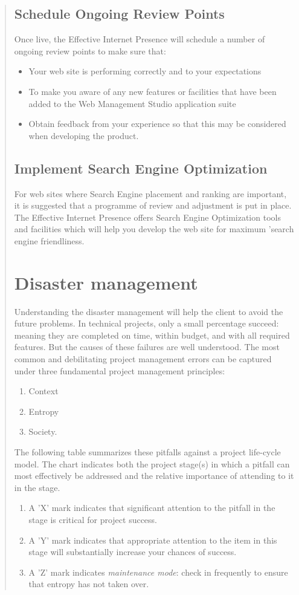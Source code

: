 \documentclass[35pt]{report}
\begin{document}
\begin{quote}
			\subsection{Schedule Ongoing Review Points}
			Once live, the Effective Internet Presence will schedule a number of ongoing review points to make sure that:
			\begin{itemize}
				\item Your web site is performing correctly and to your expectations
				\item To make you aware of any new features or facilities that have been added to the Web Management Studio application suite
				\item Obtain feedback from your experience so that this may be considered when developing the product.
			\end{itemize}
			
			\subsection{Implement Search Engine Optimization}
			For web sites where Search Engine placement and ranking are important, it is suggested that a programme of review and adjustment is put in place. The Effective Internet Presence offers Search Engine Optimization tools and facilities which will help you develop the web site for maximum 'search engine friendliness.
	
 		\section{Disaster management}

		Understanding the disaster management will help the client to avoid the future problems. In technical projects, only a small percentage succeed: meaning they are completed on time, within budget, and with all required features. But the causes of these failures are well understood. The most common and debilitating project management errors can be captured under three fundamental project management principles:
		\begin{enumerate}
			\item Context
			\item Entropy 
			\item Society.
		\end{enumerate}

		The following table summarizes these pitfalls against a project life-cycle model. The chart indicates both the project stage(s) in which a pitfall can most effectively be addressed and the relative importance of attending to it in the stage. 
		\begin{enumerate}
			\item A 'X' mark indicates that significant attention to the pitfall in the stage is critical for project
success. 
			\item A 'Y' mark indicates that appropriate attention to the item in this stage will substantially increase your chances of success.
			\item A 'Z' mark indicates {\it maintenance mode}: check in frequently to ensure that entropy has not taken over. 
		\end{enumerate}


\end{quote}
\end{document}
